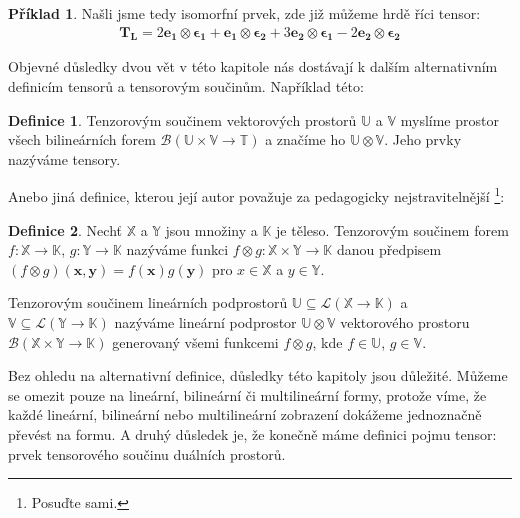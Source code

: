 \documentclass[a5paper,12pt]{amsbook}
\theoremstyle{definition}
\newtheorem{definition}{Definice}[chapter]
\newtheorem{example}{Příklad}[chapter]
\newcommand{\myvec}[1]{\bm{#1}}
\newcommand{\myspace}[1]{\mathbb{#1}}
\begin{document}
\begin{example}
Našli jsme tedy isomorfní prvek, zde již můžeme hrdě říci tensor:
\begin{equation*}
\begin{split}
\myvec{T_L}
  = 2\myvec{e_1}\otimes\myvec{\epsilon_1}
  + \myvec{e_1}\otimes\myvec{\epsilon_2}
  + 3\myvec{e_2}\otimes\myvec{\epsilon_1}
  - 2\myvec{e_2}\otimes\myvec{\epsilon_2}
\end{split}
\end{equation*}
\end{example}

\noindent
Objevné důsledky dvou vět v této kapitole nás dostávají k dalším alternativním definicím tensorů
a tensorovým součinům. Například této:

\begin{definition}
Tenzorovým součinem vektorových prostorů $\myspace{U}$ a $\myspace{V}$ myslíme prostor všech
bilineárních forem $\mathcal{B}(\myspace{U}\times\myspace{V}\rightarrow\myspace{T})$ a
značíme ho $\myspace{U}\otimes\myspace{V}$. Jeho prvky nazýváme tensory.
\end{definition}

Anebo jiná definice, kterou její autor považuje za pedagogicky nejstravitelnější
\footnote{Posuďte sami.}:

\begin{definition}
Nechť $\myspace{X}$ a $\myspace{Y}$ jsou množiny a $\myspace{K}$ je těleso. Tenzorovým součinem
forem $f: \myspace{X}\rightarrow\myspace{K}$, $g: \myspace{Y}\rightarrow\myspace{K}$ nazýváme
funkci $f\otimes g: \myspace{X}\times\myspace{Y}\rightarrow\myspace{K}$ danou předpisem
$(f\otimes g)(\myvec{x}, \myvec{y}) = f(\myvec{x})g(\myvec{y})$ pro $x\in \myspace{X}$ a $y\in\myspace{Y}$.

Tenzorovým součinem lineárních podprostorů
$\myspace{U}\subseteq\mathcal{L}(\myspace{X}\rightarrow\myspace{K})$
a $\myspace{V}\subseteq\mathcal{L}(\myspace{Y}\rightarrow\myspace{K})$ nazýváme lineární podprostor 
$\myspace{U}\otimes\myspace{V}$ vektorového prostoru
$\mathcal{B}(\myspace{X}\times\myspace{Y}\rightarrow\myspace{K})$
generovaný všemi funkcemi $f\otimes g$, kde $f\in\myspace{U}$, $g\in\myspace{V}$.
\end{definition}

\noindent
Bez ohledu na alternativní definice, důsledky této kapitoly jsou důležité. Můžeme se omezit pouze
na lineární, bilineární či multilineární formy, protože víme, že každé lineární, bilineární
nebo multilineární zobrazení dokážeme jednoznačně převést na formu. A druhý důsledek je,
že konečně máme definici pojmu tensor: prvek tensorového součinu duálních prostorů.
\end{document}
